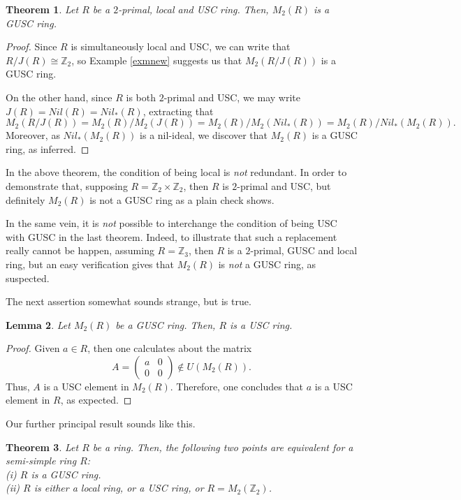 \documentclass[12pt]{amsart}
\newtheorem{theorem}{Theorem}[section]
\newtheorem{lemma}[theorem]{Lemma}
\theoremstyle{definition}
\begin{document}
\begin{theorem}\label{thm3.12}
Let $R$ be a $2$-primal, local and USC ring. Then, $M_2(R)$ is a GUSC ring.
\end{theorem}

\begin{proof}
Since $R$ is simultaneously local and USC, we can write that $R/J(R) \cong \mathbb{Z}_2$, so Example \ref{exmnew} suggests us that $M_2(R/J(R))$ is a GUSC ring.

On the other hand, since $R$ is both $2$-primal and USC, we may write $J(R) = Nil(R) = Nil_*(R)$, extracting that
$$M_2(R/J(R)) = M_2(R)/M_2(J(R)) = M_2(R)/M_2(Nil_*(R)) = M_2(R)/Nil_*(M_2(R)).$$
Moreover, as $Nil_*(M_2(R))$ is a nil-ideal, we discover that $M_2(R)$ is a GUSC ring, as inferred.
\end{proof}

In the above theorem, the condition of being local is {\it not} redundant. In order to demonstrate that, supposing $R = \mathbb{Z}_2 \times \mathbb{Z}_2$, then $R$ is $2$-primal and USC, but definitely $M_2(R)$ is not a GUSC ring as a plain check shows.

In the same vein, it is {\it not} possible to interchange the condition of being USC with GUSC in the last theorem. Indeed, to illustrate that such a replacement really cannot be happen, assuming $R = \mathbb{Z}_3$, then $R$ is a $2$-primal, GUSC and local ring, but an easy verification gives that $M_2(R)$ is {\it not} a GUSC ring, as suspected.

\medskip

The next assertion somewhat sounds strange, but is true.

\begin{lemma}\label{lem3.13}
Let $M_2(R)$ be a GUSC ring. Then, $R$ is a USC ring.
\end{lemma}

\begin{proof}
Given $a \in R$, then one calculates about the matrix $$A=\begin{pmatrix}
		a & 0 \\ 0 & 0
\end{pmatrix} \not\in U(M_2(R)).$$ Thus, $A$ is a USC element in $M_2(R)$. Therefore, one concludes that $a$ is a USC element in $R$, as expected.
\end{proof}

Our further principal result sounds like this.

\begin{theorem}\label{lem3.15}
Let $R$ be a ring. Then, the following two points are equivalent for a semi-simple ring $R$:
\\
(i) $R$ is a GUSC ring.
\\
(ii) $R$ is either a local ring, or a USC ring, or $R=M_2(\mathbb{Z}_2)$.
\end{theorem}
\end{document}
